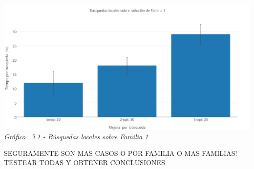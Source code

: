 \vspace*{0.3cm} \vspace*{0.3cm}
  \begin{center}
 \includegraphics[scale=0.5]{./EJ3/local_search_familia.png}
 {            \textit{Gráfico \ 3.1 - Búsquedas locales sobre Familia 1}}
  \end{center}
  \vspace*{0.3cm}
  
SEGURAMENTE SON MAS CASOS O POR FAMILIA O MAS FAMILIAS! TESTEAR TODAS Y OBTENER CONCLUSIONES
